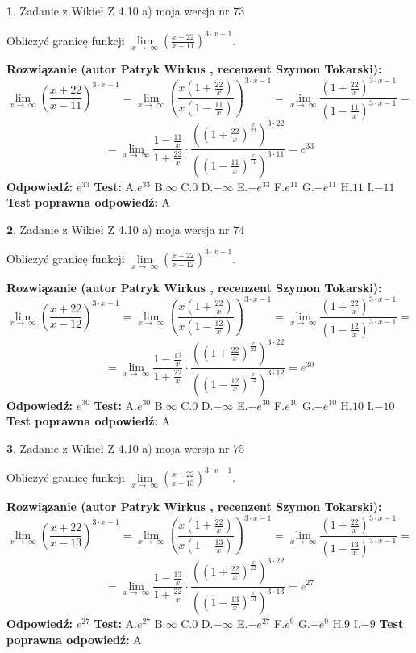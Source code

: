 \documentclass[12pt, a4paper]{article}
\theoremstyle{definition} %
\newtheorem{zad}{}
\newcommand{\zadStart}[1]{\begin{zad}#1\newline}
\newcommand{\zadStop}{\end{zad}}
\newcommand{\rozwStart}[2]{\noindent \textbf{Rozwiązanie (autor #1 , recenzent #2): }\newline}
\newcommand{\rozwStop}{\newline}
\newcommand{\odpStart}{\noindent \textbf{Odpowiedź:}\newline}
\newcommand{\odpStop}{\newline}
\newcommand{\testStart}{\noindent \textbf{Test:}\newline}
\newcommand{\testStop}{\newline}
\newcommand{\kluczStart}{\noindent \textbf{Test poprawna odpowiedź:}\newline}
\newcommand{\kluczStop}{\newline}
\begin{document}
\zadStart{Zadanie z Wikieł Z 4.10 a) moja wersja nr 73}

Obliczyć granicę funkcji  $\lim\limits_{x\to\ \infty}(\frac{x+22}{x-11})^{3\cdot x-1}$.
\zadStop
\rozwStart{Patryk Wirkus}{Szymon Tokarski}
$$\lim\limits_{x\to\ \infty}(\frac{x+22}{x-11})^{3\cdot x-1} = \lim\limits_{x\to\ \infty}(\frac{x(1+\frac{22}{x})}{x(1-\frac{11}{x})})^{3\cdot x-1}=\lim\limits_{x\to\ \infty}\frac{(1+\frac{22}{x})^{3\cdot x-1}}{(1-\frac{11}{x})^{3\cdot x-1}}=$$
$$=\lim\limits_{x\to\ \infty}\frac{1-\frac{11}{x}}{1+\frac{22}{x}}\cdot\frac{((1+\frac{22}{x})^{\frac{x}{22}})^{3\cdot22}}{((1-\frac{11}{x})^{\frac{x}{11}})^{3\cdot11}}=e^{33}$$
\rozwStop
\odpStart
$e^{33}$
\odpStop
\testStart
A.$e^{33}$ B.$\infty$ C.$0$ D.$-\infty$ E.$-e^{33}$
F.$e^{11}$ G.$-e^{11}$
H.$11$
I.$-11$
\testStop
\kluczStart
A
\kluczStop



\zadStart{Zadanie z Wikieł Z 4.10 a) moja wersja nr 74}

Obliczyć granicę funkcji  $\lim\limits_{x\to\ \infty}(\frac{x+22}{x-12})^{3\cdot x-1}$.
\zadStop
\rozwStart{Patryk Wirkus}{Szymon Tokarski}
$$\lim\limits_{x\to\ \infty}(\frac{x+22}{x-12})^{3\cdot x-1} = \lim\limits_{x\to\ \infty}(\frac{x(1+\frac{22}{x})}{x(1-\frac{12}{x})})^{3\cdot x-1}=\lim\limits_{x\to\ \infty}\frac{(1+\frac{22}{x})^{3\cdot x-1}}{(1-\frac{12}{x})^{3\cdot x-1}}=$$
$$=\lim\limits_{x\to\ \infty}\frac{1-\frac{12}{x}}{1+\frac{22}{x}}\cdot\frac{((1+\frac{22}{x})^{\frac{x}{22}})^{3\cdot22}}{((1-\frac{12}{x})^{\frac{x}{12}})^{3\cdot12}}=e^{30}$$
\rozwStop
\odpStart
$e^{30}$
\odpStop
\testStart
A.$e^{30}$ B.$\infty$ C.$0$ D.$-\infty$ E.$-e^{30}$
F.$e^{10}$ G.$-e^{10}$
H.$10$
I.$-10$
\testStop
\kluczStart
A
\kluczStop



\zadStart{Zadanie z Wikieł Z 4.10 a) moja wersja nr 75}

Obliczyć granicę funkcji  $\lim\limits_{x\to\ \infty}(\frac{x+22}{x-13})^{3\cdot x-1}$.
\zadStop
\rozwStart{Patryk Wirkus}{Szymon Tokarski}
$$\lim\limits_{x\to\ \infty}(\frac{x+22}{x-13})^{3\cdot x-1} = \lim\limits_{x\to\ \infty}(\frac{x(1+\frac{22}{x})}{x(1-\frac{13}{x})})^{3\cdot x-1}=\lim\limits_{x\to\ \infty}\frac{(1+\frac{22}{x})^{3\cdot x-1}}{(1-\frac{13}{x})^{3\cdot x-1}}=$$
$$=\lim\limits_{x\to\ \infty}\frac{1-\frac{13}{x}}{1+\frac{22}{x}}\cdot\frac{((1+\frac{22}{x})^{\frac{x}{22}})^{3\cdot22}}{((1-\frac{13}{x})^{\frac{x}{13}})^{3\cdot13}}=e^{27}$$
\rozwStop
\odpStart
$e^{27}$
\odpStop
\testStart
A.$e^{27}$ B.$\infty$ C.$0$ D.$-\infty$ E.$-e^{27}$
F.$e^{9}$ G.$-e^{9}$
H.$9$
I.$-9$
\testStop
\kluczStart
A
\kluczStop
\end{document}
